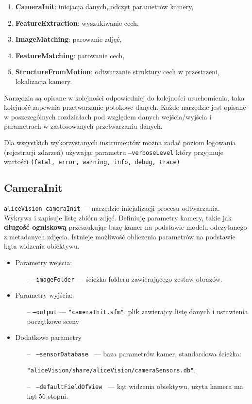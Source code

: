 \begin{enumerate}
   \item \textbf{CameraInit}: inicjacja danych, odczyt parametrów kamery,
   \item \textbf{FeatureExtraction}: wyszukiwanie cech,
   \item \textbf{ImageMatching}: parowanie zdjęć,
   \item \textbf{FeatureMatching}: parowanie cech,
   \item \textbf{StructureFromMotion}: odtwarzanie struktury cech w przestrzeni, lokalizacja kamery.
\end{enumerate}

Narzędzia są opisane w kolejności odpowiedniej do kolejności uruchomienia, taka kolejność zapewnia przetwarzanie potokowe danych.
Każde narzędzie jest opisane w poszczególnych rozdziałach pod względem danych wejścia/wyjścia i parametrach w zastosowanych przetwarzaniu danych.

Dla wszystkich wykorzystanych instrumentów można zadać poziom logowania (rejestracji zdarzeń) używając parametru \texttt{--verboseLevel} który przyjmuje wartości \texttt{(fatal, error, warning, info, debug, trace)}

\subsection{CameraInit}

\texttt{aliceVision\_cameraInit} --- narzędzie inicjalizacji procesu odtwarzania.
Wykrywa i zapisuje listę zbióru zdjęć.
Definiuję parametry kamery, takie jak \textbf{długość ogniskową} przeszukując bazę kamer na podstawie modelu odczytanego z metadanych zdjęcia. Istnieje możliwość obliczenia parametrów na podstawie kąta widzenia obiektywu.

\begin{itemize}
   \item Parametry wejścia:
   \begin{itemize}
      \item[--] \texttt{--imageFolder} --- ścieżka folderu zawierającego zestaw obrazów.
   \end{itemize}

   \item Parametry wyjścia:
   \begin{itemize}
      \item[--] \texttt{--output} --- \texttt{"cameraInit.sfm"}, plik zawierajcy listę danych i ustawienia początkowe sceny
   \end{itemize}

   \item Dodatkowe parametry
   \begin{itemize}
      \item[--] \texttt{ --sensorDatabase } --- baza parametrów kamer, standardowa ścieżka:

      \texttt{"aliceVision/share/aliceVision/cameraSensors.db"},
      \item[--] \texttt{ --defaultFieldOfView } --- kąt widzenia obiektywu, użyta kamera ma kąt 56 stopni.
   \end{itemize}
\end{itemize}

